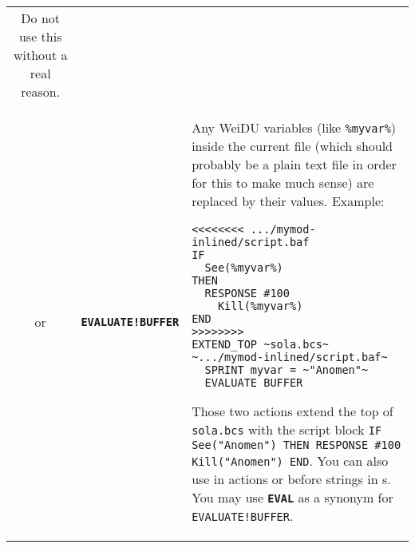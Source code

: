 \documentclass{article}
\def\ttref#1{\ahrefloc{#1}{\tt #1}}
\def\DEFINE#1{{\tt \bf #1}\label{#1}\index{#1}}
\def\t#1{{\tt #1}}
\begin{document}
\begin{tabular}{cp{10in}|p{10in}}
	Do not use this without a real reason.
\\
or & \DEFINE{EVALUATE!BUFFER} &
  Any WeiDU variables (like \t{\%myvar\%}) inside the current file (which
  should probably be a plain text file in order for this to make much sense)
  are replaced by their values. Example:
\begin{verbatim}
<<<<<<<< .../mymod-inlined/script.baf
IF
  See(%myvar%)
THEN
  RESPONSE #100
    Kill(%myvar%)
END
>>>>>>>>
EXTEND_TOP ~sola.bcs~ ~.../mymod-inlined/script.baf~
  SPRINT myvar = ~"Anomen"~
  EVALUATE_BUFFER
\end{verbatim}
  Those two actions extend the top of \t{sola.bcs} with the script
  block \t{IF See("Anomen") THEN RESPONSE \#100 Kill("Anomen") END}.
  You can also use \ttref{EVALUATE!BUFFER} in \ttref{COMPILE} actions
  or before strings in \ttref{value}s. You may use \DEFINE{EVAL} as
  a synonym for \t{EVALUATE!BUFFER}.
  \\


\end{tabular}
\end{document}
